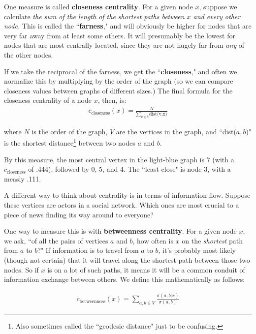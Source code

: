 \documentclass[12pt]{article}
\begin{document}
\vspace{.2in}
One measure is called \textbf{closeness centrality}. For a given node $x$,
suppose we calculate \textit{the sum of the length of the shortest paths
between $x$ and every other node.} This is called the ``\textbf{farness}," and
will obviously be higher for nodes that are very far away from at least some
others. It will presumably be the lowest for nodes that are most centrally
located, since they are not hugely far from \textit{any} of the other nodes.

If we take the reciprocal of the farness, we get the ``\textbf{closeness},"
and often we normalize this by multiplying by the order of the graph (so we
can compare closeness values between graphs of different sizes.) The final
formula for the closeness centrality of a node $x$, then, is:
\begin{align*}
c_{\textrm{closeness}}(x) = \frac{N}{\sum_{v \in V} \textrm{dist(v,x)}}
\end{align*}

where $N$ is the order of the graph, $V$ are the vertices in the graph, and
``dist($a,b$)" is the shortest distance\footnote{Also sometimes called the
``geodesic distance" just to be confusing.} between two nodes $a$ and $b$.

By this measure, the most central vertex in the light-blue graph is 7 (with a 
$c_{\textrm{closeness}}$ of .444), followed by 0, 5, and 4. The ``least close"
is node 3, with a measly .111.

\vspace{.2in}

A different way to think about centrality is in terms of information flow.
Suppose these vertices are actors in a social network. Which ones are most
crucial to a piece of news finding its way around to everyone? 

One way to measure this is with \textbf{betweenness centrality}. For a given
node $x$, we ask, ``of all the pairs of vertices $a$ and $b$, how often is $x$
on the \textit{shortest} path from $a$ to $b$?" If information is to travel
from $a$ to $b$, it's probably most likely (though not certain) that it will
travel along the shortest path between those two nodes. So if $x$ is on a lot
of such paths, it means it will be a common conduit of information exchange
between others. We define this mathematically as follows:

\begin{align*}
c_{\textrm{betweenness}}(x) = \sum_{a,b \in V} \frac{\sigma(a,b|x)}{\sigma(a,b)}
\end{align*}
\end{document}
